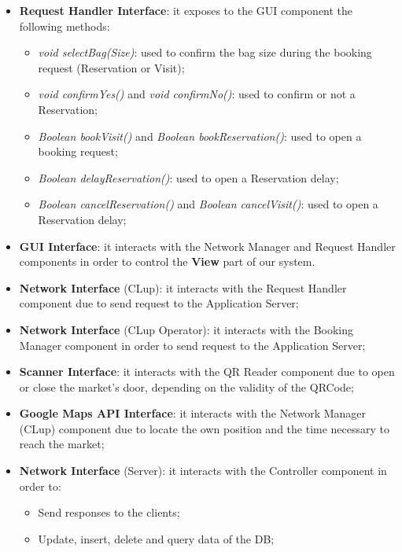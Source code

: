 \begin{itemize}

\item \textbf{Request Handler Interface}: it exposes to the GUI component the following methods:
\begin{itemize}
\item \textit{void selectBag(Size)}: used to confirm the bag size during the booking request (Reservation or Visit);
\item \textit{void confirmYes()} and \textit{void confirmNo()}: used to confirm or not a Reservation;
\item \textit{Boolean bookVisit()} and \textit{Boolean bookReservation()}: used to open a booking request;
\item \textit{Boolean delayReservation()}: used to open a Reservation delay;
\item \textit{Boolean cancelReservation()} and \textit{Boolean cancelVisit()}: used to open a Reservation delay;
\end{itemize}

\item \textbf{GUI Interface}: it interacts with the Network Manager and Request Handler components in order to control the \textbf{View} part of our system. 

\item \textbf{Network Interface} (CLup): it interacts with the Request Handler component due to send request to the Application Server;

\item \textbf{Network Interface} (CLup Operator): it interacts with the Booking Manager component in order to send request to the Application Server;


\item \textbf{Scanner Interface}: it interacts with the QR Reader component due to open or close the market's door, depending on the validity of the QRCode;

\item \textbf{Google Maps API Interface}: it interacts with the Network Manager (CLup) component due to locate the own position and the time necessary to reach the market;


\item \textbf{Network Interface} (Server): it interacts with the Controller component in order to:
\begin{itemize}
\item Send responses to the clients;
\item Update, insert, delete and query data of the DB;
\end{itemize}


\end{itemize}

